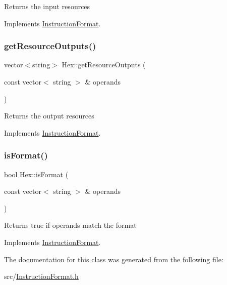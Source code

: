 Returns the input resources 

Implements \hyperlink{classInstructionFormat_a09775d3a3c22f40a0f44504664e586e4}{Instruction\+Format}.

\mbox{\label{classHex_a6fa1b11eff40eafe79e7291864915dd7}} 
\subsubsection{\texorpdfstring{get\+Resource\+Outputs()}{getResourceOutputs()}}
{\footnotesize\ttfamily vector$<$string$>$ Hex\+::get\+Resource\+Outputs (\begin{DoxyParamCaption}\item[{const vector$<$ string $>$ \&}]{operands }\end{DoxyParamCaption})\hspace{0.3cm}{\ttfamily [virtual]}}

Returns the output resources 

Implements \hyperlink{classInstructionFormat_a95cd28ffb1bde59b67f676880ab10536}{Instruction\+Format}.

\mbox{\label{classHex_aabeb457d36ac38c382cf3735a9b32648}} 
\subsubsection{\texorpdfstring{is\+Format()}{isFormat()}}
{\footnotesize\ttfamily bool Hex\+::is\+Format (\begin{DoxyParamCaption}\item[{const vector$<$ string $>$ \&}]{operands }\end{DoxyParamCaption})\hspace{0.3cm}{\ttfamily [virtual]}}

Returns true if operands match the format 

Implements \hyperlink{classInstructionFormat_a9fdcf94dcd7d9a55ba86e7a63f04d1fe}{Instruction\+Format}.



The documentation for this class was generated from the following file\+:\begin{DoxyCompactItemize}
\item 
src/\hyperlink{InstructionFormat_8h}{Instruction\+Format.\+h}\end{DoxyCompactItemize}

